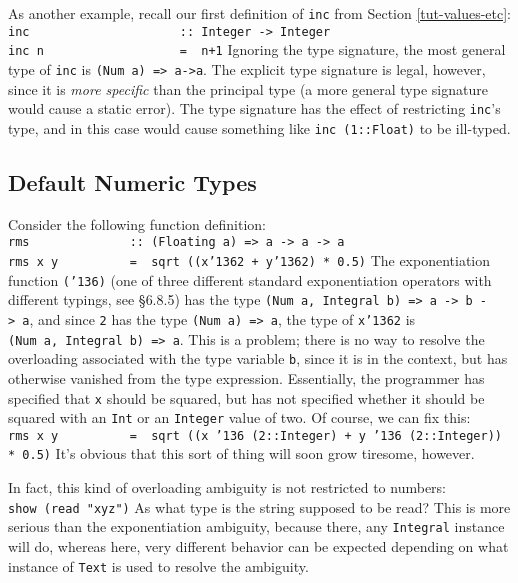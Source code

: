 As another example, recall our first definition of \mbox{\tt inc} from Section
\ref{tut-values-etc}:
\bprog
\mbox{\tt inc\ \ \ \ \ \ \ \ \ \ \ \ \ \ \ \ \ \ \ \ \ ::\ Integer\ ->\ Integer}\\
\mbox{\tt inc\ n\ \ \ \ \ \ \ \ \ \ \ \ \ \ \ \ \ \ \ =\ \ n+1}
\eprog 
Ignoring the type signature, the most general type of \mbox{\tt inc} is 
\mbox{\tt (Num\ a)\ =>\ a->a}.  The explicit type signature is legal,
however, since it is {\em more specific} than the principal type (a
more general type signature would cause a static error).  The type
signature has the effect of restricting \mbox{\tt inc}'s type, and in this
case would cause something like \mbox{\tt inc\ (1::Float)} to be ill-typed.

\subsection{Default Numeric Types}

Consider the following function definition:
\bprog
\mbox{\tt rms\ \ \ \ \ \ \ \ \ \ \ \ \ \ ::\ (Floating\ a)\ =>\ a\ ->\ a\ ->\ a}\\
\mbox{\tt rms\ x\ y\ \ \ \ \ \ \ \ \ \ =\ \ sqrt\ ((x{\char'136}2\ +\ y{\char'136}2)\ *\ 0.5)}
\eprog
The exponentiation function \mbox{\tt ({\char'136})} (one of three different standard
exponentiation operators with different typings, see \S{6.8.5}) has
the type \mbox{\tt (Num\ a,\ Integral\ b)\ =>\ a\ ->\ b\ ->\ a}, and since \mbox{\tt 2} has the
type \mbox{\tt (Num\ a)\ =>\ a}, the type of \mbox{\tt x{\char'136}2} is \mbox{\tt (Num\ a,\ Integral\ b)\ =>\ a}.
This is a problem; there is no way to resolve the overloading
associated with the type variable \mbox{\tt b}, since it is in the context, but
has otherwise vanished from the type expression.  Essentially, the
programmer has specified that \mbox{\tt x} should be squared, but has not
specified whether it should be squared with an \mbox{\tt Int} or an \mbox{\tt Integer}
value of two.  Of course, we can fix this:
\bprog
\mbox{\tt rms\ x\ y\ \ \ \ \ \ \ \ \ \ =\ \ sqrt\ ((x\ {\char'136}\ (2::Integer)\ +\ y\ {\char'136}\ (2::Integer))\ *\ 0.5)}
\eprog
It's obvious that this sort of thing will soon grow tiresome, however.

In fact, this kind of overloading ambiguity is not restricted to
numbers:
\bprog
\mbox{\tt show\ (read\ "xyz")}
\eprog
As what type is the string supposed to be read?  This is
more serious than the exponentiation ambiguity, because there, any
\mbox{\tt Integral} instance will do, whereas here, very different behavior
can be expected depending on what instance of \mbox{\tt Text} is used to
resolve the ambiguity.

